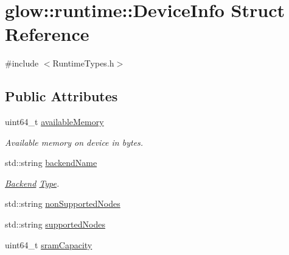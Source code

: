 \hypertarget{structglow_1_1runtime_1_1_device_info}{}\section{glow\+:\+:runtime\+:\+:Device\+Info Struct Reference}
\label{structglow_1_1runtime_1_1_device_info}


{\ttfamily \#include $<$Runtime\+Types.\+h$>$}

\subsection*{Public Attributes}
\begin{DoxyCompactItemize}
\item 
\mbox{\label{structglow_1_1runtime_1_1_device_info_adad20514fd6cbf540fc4ac3d884d4ef9}} 
uint64\+\_\+t \hyperlink{structglow_1_1runtime_1_1_device_info_adad20514fd6cbf540fc4ac3d884d4ef9}{available\+Memory}
\begin{DoxyCompactList}\small\item\em Available memory on device in bytes. \end{DoxyCompactList}\item 
\mbox{\label{structglow_1_1runtime_1_1_device_info_a48fdaa5e39cc3cefc11d04d5fe15dd15}} 
std\+::string \hyperlink{structglow_1_1runtime_1_1_device_info_a48fdaa5e39cc3cefc11d04d5fe15dd15}{backend\+Name}
\begin{DoxyCompactList}\small\item\em \hyperlink{classglow_1_1_backend}{Backend} \hyperlink{structglow_1_1_type}{Type}. \end{DoxyCompactList}\item 
std\+::string \hyperlink{structglow_1_1runtime_1_1_device_info_a732b81463b0439deec1666f33cef128f}{non\+Supported\+Nodes}
\item 
std\+::string \hyperlink{structglow_1_1runtime_1_1_device_info_af83b26fbfab3a0c8397885fa42767fd6}{supported\+Nodes}
\item 
\mbox{\label{structglow_1_1runtime_1_1_device_info_a40b28ee8233660b1dd8e48ecab1d6e23}} 
uint64\+\_\+t \hyperlink{structglow_1_1runtime_1_1_device_info_a40b28ee8233660b1dd8e48ecab1d6e23}{sram\+Capacity}

\end{DoxyCompactItemize}
